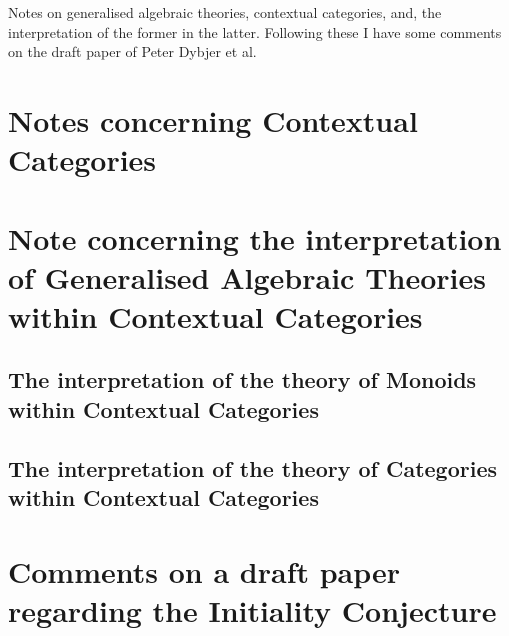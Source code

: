 \documentclass[10pt,a4paper]{article}
\theoremstyle{remark}
\begin{document}
\newcommand{\gatinterpretationmapeqv}[2]{&&&=&\ \ $#1$&#2}

\newcommand{\gatinterpretationaxcond}[5]{
\refstepcounter{equation}(\theequation)\label{#1}& \gatrule{#2}{#3}&$\scriptstyle iff$&&\cellcolor{lightergrey}$#4$&#5}

\newcommand{\gatinterpretationaxeqv}[2]{&&$\scriptstyle iff$&&$#1$&#2}

\newcommand{\duple}[1]{\llangle #1 \rrangle}

\newcommand{\bigtuple}[1]{\big \langle #1 \big \rangle}


Notes on  generalised algebraic theories, contextual categories, and, the interpretation of the former in the latter. Following these I have some comments on the draft paper of Peter Dybjer et al. 
\iffalse
\section{Note concerning Generalised Algebraic Theories}

\newpage
\fi
\section{Notes concerning Contextual Categories}




\newpage
\section{Note concerning the interpretation of Generalised Algebraic Theories within Contextual Categories}


\newpage
\subsection{The interpretation of the theory of Monoids within Contextual Categories}
 

\newpage
\subsection{The interpretation of the theory of Categories within Contextual Categories}


\section{Comments on a draft paper regarding the Initiality Conjecture}


%

% 


\end{document}
